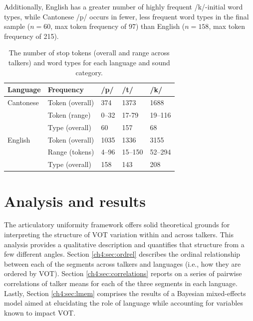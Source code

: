Additionally, English has a greater number of highly frequent /k/-initial word types, while Cantonese /p/ occurs in fewer, less frequent word types in the final sample ($n=60$, max token frequency of 97) than English ($n=158$, max token frequency of 215). 

\begin{table}[htb]
  \caption{The number of stop tokens (overall and range across talkers) and word types for each language and sound category.}
  \label{ch3:tab:counts}
  \centering
  \begin{tabular}{lllll}
    \toprule
    \textbf{Language} & \textbf{Frequency} & \textbf{/p/} & \textbf{/t/} & \textbf{/k/} \\
    \midrule
    Cantonese         & Token (overall) & 374      & 1373         & 1688    \\
                      & Token (range)   & 0--32    & 17-79        & 19--116 \\
                      & Type (overall)  & 60       & 157          & 68      \\
    English           & Token (overall) & 1035     & 1336         & 3155   \\
                      & Range (tokens)  & 4--96    & 15--150      & 52--294 \\
                      & Type  (overall) & 158      & 143          & 208     \\
    \bottomrule     
  \end{tabular}
\end{table}

\section{Analysis and results}

The articulatory uniformity framework offers solid theoretical grounds for interpreting the structure of VOT variation within and across talkers. This analysis provides a qualitative description and quantifies that structure from a few different angles. Section \ref{ch4:sec:ordrel} describes the ordinal relationship between each of the segments across talkers and languages (i.e., how they are ordered by VOT). Section \ref{ch4:sec:correlations} reports on a series of pairwise correlations of talker means for each of the three segments in each language. Lastly, Section \ref{ch4:sec:lmem} comprises the results of a Bayesian mixed-effects model aimed at elucidating the role of language while accounting for variables known to impact VOT.


